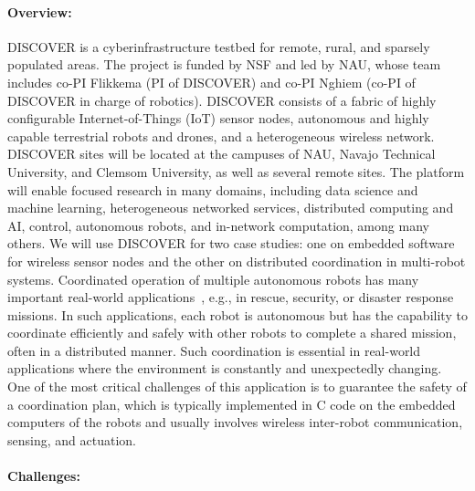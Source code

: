 \paragraph{Overview:}

DISCOVER %
is a cyberinfrastructure testbed for remote, rural, and sparsely populated areas.
The project is funded by NSF and led by NAU, whose team includes co-PI Flikkema (PI of DISCOVER) and co-PI Nghiem (co-PI of DISCOVER in charge of robotics).
DISCOVER consists of a fabric of highly configurable Internet-of-Things (IoT) sensor nodes, autonomous and highly capable terrestrial robots and drones, and a heterogeneous wireless network.
DISCOVER sites will be located at the campuses of NAU, Navajo Technical University, and Clemsom University, as well as several remote sites.
The platform will enable focused research in many domains, including data science and machine learning, heterogeneous networked services, distributed computing and AI, control, autonomous robots, and in-network computation, among many others.
%
We will use DISCOVER for two case studies: one on embedded software for wireless sensor nodes and the other on distributed coordination in multi-robot systems.
Coordinated operation of multiple autonomous robots %
has many important real-world applications~\cite{multirobot2005,multirobotsurvey2013}, e.g., in rescue, security, or disaster response missions. %
In such applications, each robot is autonomous but has the capability to coordinate efficiently and safely with other robots to complete a shared mission, often in a distributed manner. %
Such coordination is essential in real-world applications where the environment is constantly and unexpectedly changing.
One of the most critical challenges of this application is to guarantee the safety of a coordination plan, which is typically implemented in C code on the embedded computers of the robots and usually involves wireless inter-robot communication, sensing, and actuation.


\paragraph{Challenges:}

